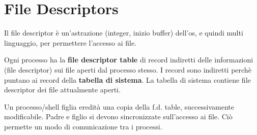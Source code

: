 \section{File Descriptors}
Il file descriptor è un'astrazione (integer, inizio buffer) dell'os, e quindi multi linguaggio, per permettere l'accesso ai file.

Ogni processo ha la \textbf{file descriptor table} di record indiretti delle informazioni (file descriptor) sui file aperti dal processo stesso.
I record sono indiretti perchè puntano ai record della \textbf{tabella di sistema}. La tabella di sistema contiene file descriptor dei file attualmente aperti.

Un processo/shell figlia eredità una copia della f.d. table, successivamente modificabile. Padre e figlio si devono sincronizzate sull'accesso ai file. Ciò permette un modo di comunicazione tra i processi.


